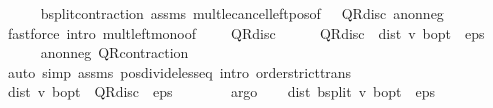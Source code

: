 \begin{isabellebody}
\ \ \ \ \isamarkupfalse%
\ {\isasymL}\isactrlsub b{\isacharunderscore}{\kern0pt}split{\isacharunderscore}{\kern0pt}contraction\ assms\ mult{\isacharunderscore}{\kern0pt}le{\isacharunderscore}{\kern0pt}cancel{\isacharunderscore}{\kern0pt}left{\isacharunderscore}{\kern0pt}pos{\isacharbrackleft}{\kern0pt}of\ {\isachardoublequoteopen}{}\ {\isacharasterisk}{\kern0pt}\ QR{\isacharunderscore}{\kern0pt}disc{\isachardoublequoteclose}{\isacharbrackright}{\kern0pt}\ a{\isacharunderscore}{\kern0pt}nonneg\isanewline
\ \ \ \ \isamarkupfalse%
\ {\isacharparenleft}{\kern0pt}fastforce\ intro{\isacharbang}{\kern0pt}{\isacharcolon}{\kern0pt}\ mult{\isacharunderscore}{\kern0pt}left{\isacharunderscore}{\kern0pt}mono{\isacharbrackleft}{\kern0pt}of\ {\isacharunderscore}{\kern0pt}\ {\isacharunderscore}{\kern0pt}\ {\isachardoublequoteopen}{}\ {\isacharasterisk}{\kern0pt}\ QR{\isacharunderscore}{\kern0pt}disc{\isachardoublequoteclose}{\isacharbrackright}{\kern0pt}{\isacharparenright}{\kern0pt}\isanewline
\ \ \isamarkupfalse%
\ {\isachardoublequoteopen}{}\ {\isacharasterisk}{\kern0pt}\ QR{\isacharunderscore}{\kern0pt}disc\ {\isacharasterisk}{\kern0pt}\ dist\ v\ {\isasymnu}\isactrlsub b{\isacharunderscore}{\kern0pt}opt\ {\isacharless}{\kern0pt}\ eps{\isachardoublequoteclose}\isanewline
\ \ \ \ \isamarkupfalse%
\ a{\isacharunderscore}{\kern0pt}nonneg\ QR{\isacharunderscore}{\kern0pt}contraction\isanewline
\ \ \ \ \isamarkupfalse%
\ {\isacharparenleft}{\kern0pt}auto\ simp{\isacharcolon}{\kern0pt}\ assms{\isacharparenleft}{\kern0pt}{}{\isacharparenright}{\kern0pt}\ pos{\isacharunderscore}{\kern0pt}divide{\isacharunderscore}{\kern0pt}less{\isacharunderscore}{\kern0pt}eq\ intro{\isacharcolon}{\kern0pt}\ order{\isachardot}{\kern0pt}strict{\isacharunderscore}{\kern0pt}trans{}{\isacharparenright}{\kern0pt}\isanewline
\ \ \isamarkupfalse%
\ {\isachardoublequoteopen}dist\ v\ {\isasymnu}\isactrlsub b{\isacharunderscore}{\kern0pt}opt\ {\isacharasterisk}{\kern0pt}\ QR{\isacharunderscore}{\kern0pt}disc\ {\isacharless}{\kern0pt}\ eps\ {\isacharslash}{\kern0pt}\ {}{\isachardoublequoteclose}\isanewline
\ \ \ \ \isamarkupfalse%
\ argo\isanewline
\ \ \isamarkupfalse%
\ {\isachardoublequoteopen}dist\ {\isacharparenleft}{\kern0pt}{\isasymL}\isactrlsub b{\isacharunderscore}{\kern0pt}split\ v{\isacharparenright}{\kern0pt}\ {\isasymnu}\isactrlsub b{\isacharunderscore}{\kern0pt}opt\ {\isacharless}{\kern0pt}\ eps\ {\isacharslash}{\kern0pt}\ {}{\isachardoublequoteclose}\isanewline

\end{isabellebody}
